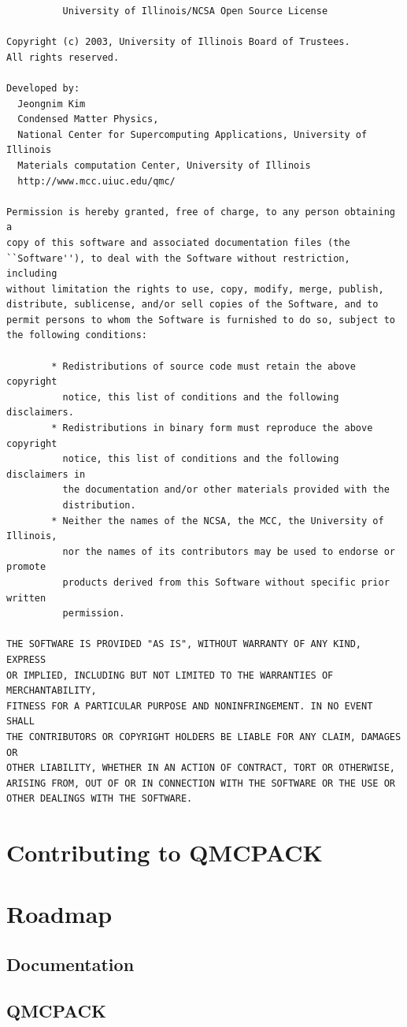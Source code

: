 \begin{verbatim}
		  University of Illinois/NCSA Open Source License

Copyright (c) 2003, University of Illinois Board of Trustees.
All rights reserved.

Developed by:   
  Jeongnim Kim
  Condensed Matter Physics,
  National Center for Supercomputing Applications, University of Illinois
  Materials computation Center, University of Illinois
  http://www.mcc.uiuc.edu/qmc/

Permission is hereby granted, free of charge, to any person obtaining a
copy of this software and associated documentation files (the
``Software''), to deal with the Software without restriction, including
without limitation the rights to use, copy, modify, merge, publish,
distribute, sublicense, and/or sell copies of the Software, and to
permit persons to whom the Software is furnished to do so, subject to
the following conditions:

        * Redistributions of source code must retain the above copyright 
          notice, this list of conditions and the following disclaimers.
        * Redistributions in binary form must reproduce the above copyright 
          notice, this list of conditions and the following disclaimers in 
          the documentation and/or other materials provided with the 
          distribution.
        * Neither the names of the NCSA, the MCC, the University of Illinois, 
          nor the names of its contributors may be used to endorse or promote 
          products derived from this Software without specific prior written 
          permission.

THE SOFTWARE IS PROVIDED "AS IS", WITHOUT WARRANTY OF ANY KIND, EXPRESS
OR IMPLIED, INCLUDING BUT NOT LIMITED TO THE WARRANTIES OF MERCHANTABILITY, 
FITNESS FOR A PARTICULAR PURPOSE AND NONINFRINGEMENT. IN NO EVENT SHALL 
THE CONTRIBUTORS OR COPYRIGHT HOLDERS BE LIABLE FOR ANY CLAIM, DAMAGES OR 
OTHER LIABILITY, WHETHER IN AN ACTION OF CONTRACT, TORT OR OTHERWISE, 
ARISING FROM, OUT OF OR IN CONNECTION WITH THE SOFTWARE OR THE USE OR 
OTHER DEALINGS WITH THE SOFTWARE.

\end{verbatim}

\section{Contributing to QMCPACK}
\label{sec:contributing}

\section{Roadmap}
\label{sec:roadmap}

\subsection{Documentation}

\subsection{QMCPACK}
